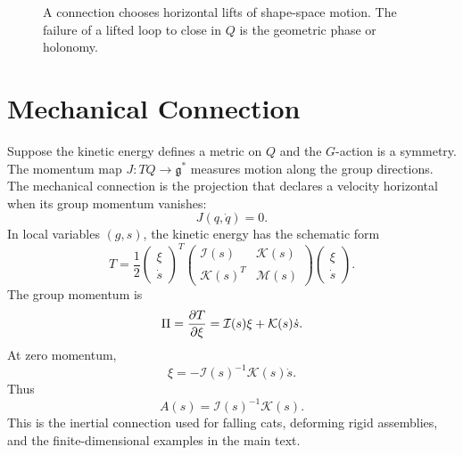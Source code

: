\begin{figure}[htbp]
\centering
{}
\caption{A connection chooses horizontal lifts of shape-space motion.  The
failure of a lifted loop to close in \(Q\) is the geometric phase or holonomy.}
\label{fig:gauge-principal-bundle}
\end{figure}

\section{Mechanical Connection}
\label{sec:mechanical-connection-taxonomy}

Suppose the kinetic energy defines a metric on \(Q\) and the \(G\)-action is a
symmetry.  The momentum map \(J:TQ\to\mathfrak{g}^*\) measures motion along the
group directions.  The mechanical connection is the projection that declares a
velocity horizontal when its group momentum vanishes:
\[
        J(q,\dot q)=0.
\]
In local variables \((g,s)\), the kinetic energy has the schematic form
\[
        T
        =
        \frac{1}{2}
        \begin{pmatrix}\xi\\ \dot s\end{pmatrix}^T
        \begin{pmatrix}
        \mathcal{I}(s) & \mathcal{K}(s)\\
        \mathcal{K}(s)^T & \mathcal{M}(s)
        \end{pmatrix}
        \begin{pmatrix}\xi\\ \dot s\end{pmatrix}.
\]
The group momentum is
\[
        \Pi=\frac{\partial T}{\partial \xi}
        =
        \mathcal{I}(s)\xi+\mathcal{K}(s)\dot s .
\]
At zero momentum,
\[
        \xi=-\mathcal{I}(s)^{-1}\mathcal{K}(s)\dot s.
\]
Thus
\[
        A(s)=\mathcal{I}(s)^{-1}\mathcal{K}(s).
\]
This is the inertial connection used for falling cats, deforming rigid
assemblies, and the finite-dimensional examples in the main text.

